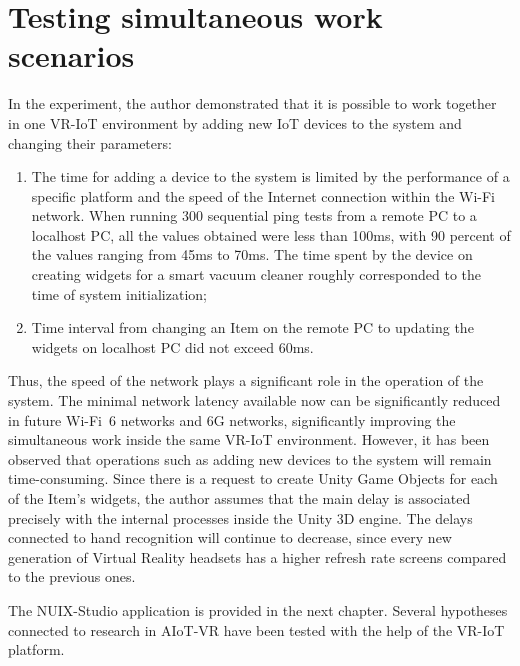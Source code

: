 \section{Testing simultaneous work scenarios}

In the experiment, the author demonstrated that it is possible to work together in one VR-IoT environment by adding new IoT devices to the system and changing their parameters:
\begin{enumerate}
    \item The time for adding a device to the system is limited by the performance of a specific platform and the speed of the Internet connection within the Wi-Fi network. When running 300 sequential ping tests from a remote PC to a localhost PC, all the values ​​obtained were less than 100ms, with 90 percent of the values ranging from 45ms to 70ms. The time spent by the device on creating widgets for a smart vacuum cleaner roughly corresponded to the time of system initialization;
    \item Time interval from changing an Item on the remote PC to updating the widgets on localhost PC did not exceed 60ms.
\end{enumerate}

Thus, the speed of the network plays a significant role in the operation of the system. The minimal network latency available now can be significantly reduced in future Wi-Fi~6 networks and 6G networks, significantly improving the simultaneous work inside the same VR-IoT environment. However, it has been observed that operations such as adding new devices to the system will remain time-consuming. Since there is a request to create Unity Game Objects for each of the Item's widgets, the author assumes that the main delay is associated precisely with the internal processes inside the Unity 3D engine. The delays connected to hand recognition will continue to decrease, since every new generation of Virtual Reality headsets has a higher refresh rate screens compared to the previous ones. 

The NUIX-Studio application is provided in the next chapter. Several hypotheses connected to research in AIoT-VR have been tested with the help of the VR-IoT platform. 